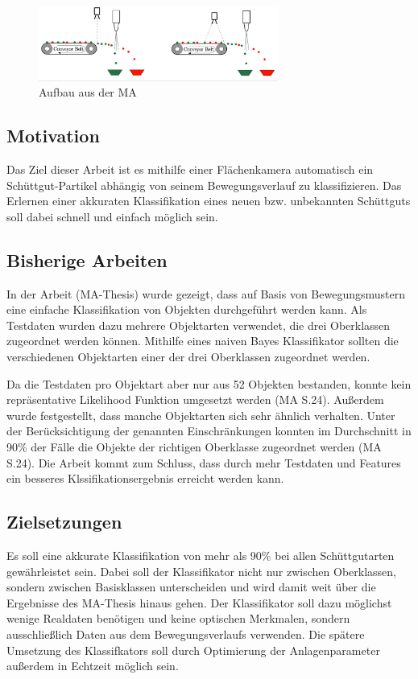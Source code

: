 \begin{figure}[!h]
    \centering
    \includegraphics[width=0.7\textwidth]{pics/aufbau.png}
    \caption{Aufbau aus der MA}
    \label{fig:Aufbau}
\end{figure}

\subsection{Motivation}
Das Ziel dieser Arbeit ist es mithilfe einer Flächenkamera automatisch ein Schüttgut-Partikel abhängig von seinem Bewegungsverlauf zu klassifizieren. Das Erlernen einer akkuraten Klassifikation eines neuen bzw. unbekannten Schüttguts soll dabei schnell und einfach möglich sein. 

\subsection{Bisherige Arbeiten}
In der Arbeit (MA-Thesis) wurde gezeigt, dass auf Basis von Bewegungsmustern eine einfache Klassifikation von Objekten durchgeführt werden kann. Als Testdaten wurden dazu mehrere Objektarten verwendet, die drei Oberklassen zugeordnet werden können. Mithilfe eines naiven Bayes Klassifikator sollten die verschiedenen Objektarten einer der drei Oberklassen zugeordnet werden.

Da die Testdaten pro Objektart aber nur aus 52 Objekten bestanden, konnte kein repräsentative Likelihood Funktion umgesetzt werden (MA S.24). Außerdem wurde festgestellt, dass manche Objektarten sich sehr ähnlich verhalten. Unter der Berücksichtigung der genannten Einschränkungen konnten im Durchschnitt in 90\% der Fälle die Objekte der richtigen Oberklasse zugeordnet werden (MA S.24). Die Arbeit kommt zum Schluss, dass durch mehr Testdaten und Features ein besseres Klssifikationsergebnis erreicht werden kann.

\subsection{Zielsetzungen}
Es soll eine akkurate Klassifikation von mehr als 90\% bei allen Schüttgutarten gewährleistet sein. Dabei soll der Klassifikator nicht nur zwischen Oberklassen, sondern zwischen Basisklassen unterscheiden und wird damit weit über die Ergebnisse des MA-Thesis hinaus gehen. Der Klassifikator soll dazu möglichst wenige Realdaten benötigen und keine optischen Merkmalen, sondern ausschließlich Daten aus dem Bewegungsverlaufs verwenden. Die spätere Umsetzung des Klassifkators soll durch Optimierung der Anlagenparameter 
außerdem in Echtzeit möglich sein. 




